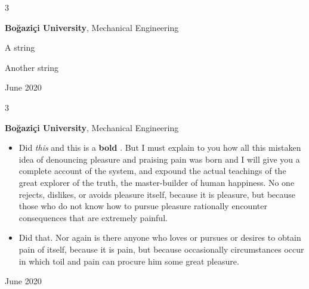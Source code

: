 \documentclass[10pt, letterpaper]{article}
\newenvironment{summary}{
    \begin{description}[
        topsep=0.10 cm,
        parsep=0.10 cm,
        partopsep=0pt,
        itemsep=0pt,
        leftmargin=0.4 cm + 10pt
    ]
}{
    \end{description}
} %
\newenvironment{highlights}{
    \begin{itemize}[
        topsep=0.10 cm,
        parsep=0.10 cm,
        partopsep=0pt,
        itemsep=0pt,
        leftmargin=0.4 cm + 10pt
    ]
}{
    \end{itemize}
} %
\newenvironment{threecolentry}[3][]{
    \onecolentry
    \def\thirdColumn{#3}
    \setcolumnwidth{1 cm, \fill, 4.5 cm}
    \begin{paracol}{3}
    {\raggedright #2} \switchcolumn
}{
    \switchcolumn \raggedleft \thirdColumn
    \end{paracol}
    \endonecolentry
} %
\let\hrefWithoutArrow\href
\renewcommand{\href}[2]{\hrefWithoutArrow{#1}{\ifthenelse{\equal{#2}{}}{ }{#2 }\raisebox{.15ex}{\footnotesize \faExternalLink*}}}
\begin{document}
        \begin{threecolentry}{\textbf{}}{
            June 2020
        }
            \textbf{Boğaziçi University}, Mechanical Engineering
            \begin{summary}
                \item A string
                \item Another string
            \end{summary}
        \end{threecolentry}

        \vspace{0.2 cm}

        \begin{threecolentry}{\textbf{}}{
            June 2020
        }
            \textbf{Boğaziçi University}, Mechanical Engineering
            \begin{highlights}
                \item Did \textit{this} and this is a \textbf{bold} \href{https://example.com}{link}. But I must explain to you how all this mistaken idea of denouncing pleasure and praising pain was born and I will give you a complete account of the system, and expound the actual teachings of the great explorer of the truth, the master-builder of human happiness. No one rejects, dislikes, or avoids pleasure itself, because it is pleasure, but because those who do not know how to pursue pleasure rationally encounter consequences that are extremely painful.
                \item Did that. Nor again is there anyone who loves or pursues or desires to obtain pain of itself, because it is pain, but because occasionally circumstances occur in which toil and pain can procure him some great pleasure.
            \end{highlights}
        \end{threecolentry}

        \vspace{0.2 cm}
\end{document}
